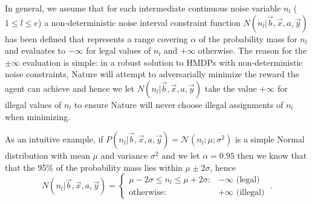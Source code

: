In general, we assume that for each intermediate continuous noise variable 
$n_l$ ($1 \leq l \leq e$)
a non-deterministic noise interval constraint function $N(n_l| \vec{b},\vec{x},a,\vec{y})$ 
has been defined 
that represents a range covering $\alpha$ of the probability mass for $n_l$ and evaluates to 
$-\infty$ for legal values of $n_l$ and $+\infty$ otherwise.  The reason for
the $\pm \infty$ evaluation is simple: 
in a robust solution to HMDPs with non-deterministic noise constraints, Nature will
attempt to adversarially minimize the reward the agent can achieve and hence we let
$N(n_l| \vec{b},\vec{x},a,\vec{y})$ take the value $+\infty$ for illegal values
of $n_l$ to ensure Nature will never choose illegal assignments of $n_l$ when minimizing.

As an intuitive example, if 
$P(n_l| \vec{b},\vec{x},a,\vec{y}) = \mathcal{N}(n_l; \mu; \sigma^2)$
is a simple Normal distribution with mean $\mu$ and variance $\sigma^2$ and we let $\alpha = 0.95$ 
then we know that that the 95\% of the probability mass
lies within $\mu \pm 2\sigma$, hence
\begin{equation*}
N(n_l| \vec{b},\vec{x},a,\vec{y}) = 
\begin{cases}
\mu - 2\sigma \leq n_l \leq \mu + 2 \sigma: & -\infty \text{ (legal)}\\
\text{otherwise} : & +\infty \text{ (illegal)}
\end{cases} \; .
\end{equation*}


